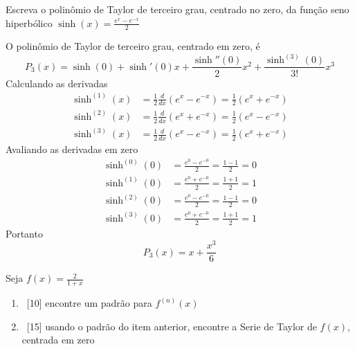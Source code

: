\documentclass[a4paper,12pt,fleqn]{article}
\begin{document}

  Escreva o polinômio de Taylor de terceiro grau, centrado no zero,
  da função seno hiperbólico
  \(
      \sinh(x)=\frac{e^x-e^{-x}}{2}
  \)

\begin{answer}
  O polinômio de Taylor de terceiro grau, centrado em zero, é
  \[
    P_3(x) = \sinh(0) + \sinh'(0) x + \frac{\sinh''(0)}{2}x^2 + \frac{\sinh^{(3)}(0)}{3!}x^3
  \]
  Calculando as derivadas
  \begin{align*}
    \sinh^{(1)}(x) & = \frac{1}{2}\frac{d}{dx}\left(e^x-e^{-x}\right)
                     = \frac{1}{2}\left(e^x+e^{-x}\right) \\[2mm]
    \sinh^{(2)}(x) & = \frac{1}{2}\frac{d}{dx}\left(e^x+e^{-x}\right)
                     = \frac{1}{2}\left(e^x-e^{-x}\right) \\[2mm]
    \sinh^{(3)}(x) & = \frac{1}{2}\frac{d}{dx}\left(e^x-e^{-x}\right)
                     = \frac{1}{2}\left(e^x+e^{-x}\right)
  \end{align*}
  Avaliando as derivadas em zero
  \begin{align*}
  \sinh^{(0)}(0) & = \frac{e^0-e^{-0}}{2} = \frac{1-1}{2} = 0  \\[2mm]
  \sinh^{(1)}(0) & = \frac{e^0+e^{-0}}{2} = \frac{1+1}{2} = 1  \\[2mm]
  \sinh^{(2)}(0) & = \frac{e^0-e^{-0}}{2} = \frac{1-1}{2} = 0  \\[2mm]
  \sinh^{(3)}(0) & = \frac{e^0+e^{-0}}{2} = \frac{1+1}{2} = 1
  \end{align*}
  Portanto
  \[
    P_3(x) = x + \frac{x^3}{6}
  \]
\end{answer}

Seja \( f(x) = \frac{2}{1+x}\)
\begin{enumerate}[label=\alph*)]
  \item\ [10] encontre um padrão para \(f^{(n)}(x)\)
  \item\ [15] usando o padrão do item anterior, encontre a
                   Serie de Taylor de $f(x)$, centrada em zero
\end{enumerate}
\end{document}
